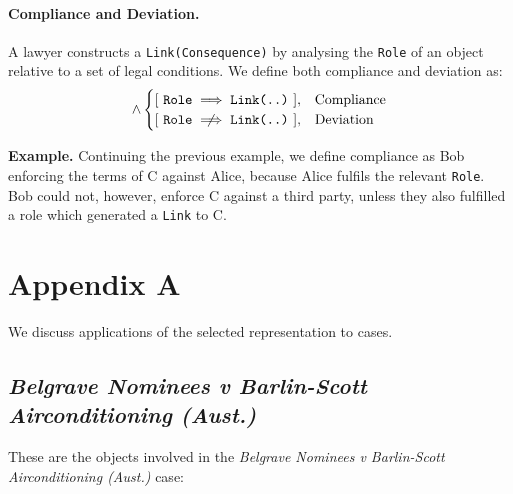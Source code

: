 \documentclass{article}
\numberwithin{equation}{section}
\newcommand{\quickexample}[1]{
\begin{tcolorbox}
	\textbf{Example.} #1
\end{tcolorbox}
}
\begin{document}
\paragraph{Compliance and Deviation.} A lawyer constructs a \texttt{Link(Consequence)} by analysing the \texttt{Role} of an object relative to a set of legal conditions. We define both compliance and deviation as:
\begin{equation}
[ \ \exists \ \texttt{Link(Existence, Consequence)} \ ] \land 
	\begin{cases}
		[ \ \texttt{Role} \implies \texttt{Link(..)} \ ], & \text{Compliance} \\
		[ \ \texttt{Role} \centernot\implies \texttt{Link(..)} \ ], & \text{Deviation}
	\end{cases}
\end{equation}

\vspace{0.25cm}
\quickexample{
	Continuing the previous example, we define compliance as Bob enforcing the terms of C against Alice, because Alice fulfils the relevant \texttt{Role}. Bob could not, however, enforce C against a third party, unless they also fulfilled a role which generated a \texttt{Link} to C.
}















\pagebreak
\section{Appendix A}

We discuss applications of the selected representation to cases.

\subsection{\textit{Belgrave Nominees v Barlin-Scott Airconditioning (Aust.)}}  

These are the objects involved in the \textit{Belgrave Nominees v Barlin-Scott Airconditioning (Aust.)} case:
\end{document}
